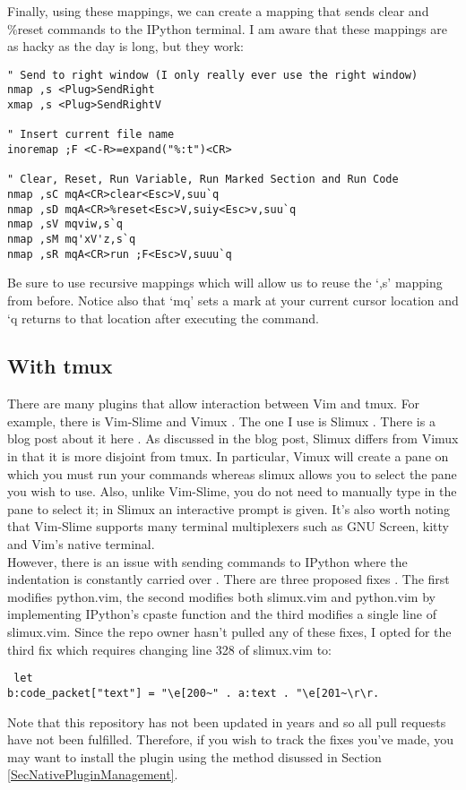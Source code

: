 \documentclass[10pt]{article}
\begin{document}
Finally, using these mappings, we can create a mapping that sends clear and
\%reset commands to the IPython terminal. I am aware that these mappings are as
hacky as the day is long, but they work:
\begin{lstlisting}
" Send to right window (I only really ever use the right window)
nmap ,s <Plug>SendRight
xmap ,s <Plug>SendRightV

" Insert current file name
inoremap ;F <C-R>=expand("%:t")<CR>

" Clear, Reset, Run Variable, Run Marked Section and Run Code
nmap ,sC mqA<CR>clear<Esc>V,suu`q 
nmap ,sD mqA<CR>%reset<Esc>V,suiy<Esc>v,suu`q
nmap ,sV mqviw,s`q
nmap ,sM mq'xV'z,s`q
nmap ,sR mqA<CR>run ;F<Esc>V,suuu`q
\end{lstlisting}
Be sure to use recursive mappings which will allow us to reuse the `,s' mapping
from before. Notice also that `mq' sets a mark at your current cursor location
and `q returns to that location after executing the command.

\subsection{With tmux}
There are many plugins that allow interaction between Vim and tmux. For example,
there is Vim-Slime \cite{jpalardy2012slime} and Vimux \cite{benmills2009vimux}.
The one I use is Slimux \cite{esamattis2015slimux}. There is a blog post about
it here \cite{suuronen2012slimux}. As discussed in the blog post, Slimux differs
from Vimux in that it is more disjoint from tmux. In particular, Vimux will
create a pane on which you must run your commands whereas slimux allows you to
select the pane you wish to use. Also, unlike Vim-Slime, you do not need to
manually type in the pane to select it; in Slimux an interactive prompt is
given. It's also worth noting that Vim-Slime supports many terminal multiplexers
such as GNU Screen, kitty and Vim's native terminal.\\

However, there is an issue with sending commands to IPython where the
indentation is constantly carried over \cite{kmARC2015indentationerror}. There
are three proposed fixes
\cite{lotabout2017remove,karadaharu2016add,zcesur2018fix}. The first modifies
python.vim, the second modifies both slimux.vim and python.vim by implementing
IPython's cpaste function and the third modifies a single line of slimux.vim.
Since the repo owner hasn't pulled any of these fixes, I opted for the third fix
which requires changing line 328 of slimux.vim to: 
\begin{lstlisting} let
b:code_packet["text"] = "\e[200~" . a:text . "\e[201~\r\r.  
\end{lstlisting}
Note that this repository has not been updated in years and so all pull requests
have not been fulfilled. Therefore, if you wish to track the fixes you've made,
you may want to install the plugin using the method disussed in Section
\ref{SecNativePluginManagement}.\\
\end{document}
